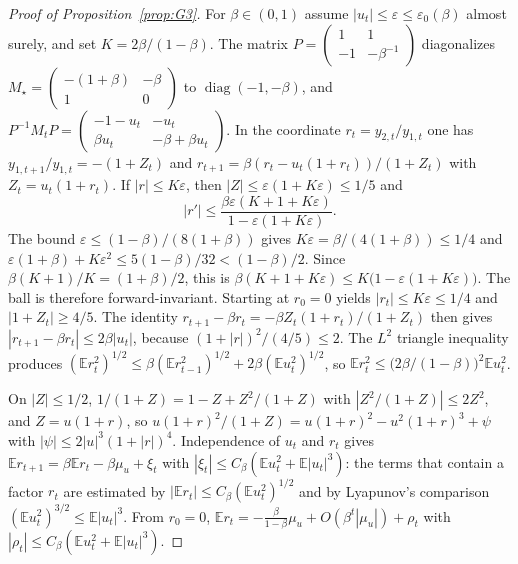 \documentclass[11pt]{article}
\theoremstyle{remark}
\newcommand{\E}{\mathbb{E}}
\begin{document}
\begin{proof}[Proof of Proposition~\ref{prop:G3}]
For $\beta\in(0,1)$ assume $|u_t|\le\varepsilon\le\varepsilon_0(\beta)$ almost surely, and set $K=2\beta/(1-\beta)$. The matrix $P=\begin{pmatrix}1&1\\-1&-\beta^{-1}\end{pmatrix}$ diagonalizes $M_\star=\begin{pmatrix}-(1+\beta)&-\beta\\1&0\end{pmatrix}$ to $\operatorname{diag}(-1,-\beta)$, and $P^{-1}M_tP=\begin{pmatrix}-1-u_t&-u_t\\\beta u_t&-\beta+\beta u_t\end{pmatrix}$. In the coordinate $r_t=y_{2,t}/y_{1,t}$ one has $y_{1,t+1}/y_{1,t}=-(1+Z_t)$ and $r_{t+1}=\beta(r_t-u_t(1+r_t))/(1+Z_t)$ with $Z_t=u_t(1+r_t)$. If $|r|\le K\varepsilon$, then $|Z|\le\varepsilon(1+K\varepsilon)\le1/5$ and
\[
|r'|\le\frac{\beta\varepsilon(K+1+K\varepsilon)}{1-\varepsilon(1+K\varepsilon)}.
\]
The bound $\varepsilon\le(1-\beta)/(8(1+\beta))$ gives $K\varepsilon=\beta/(4(1+\beta))\le1/4$ and $\varepsilon(1+\beta)+K\varepsilon^2\le5(1-\beta)/32<(1-\beta)/2$. Since $\beta(K+1)/K=(1+\beta)/2$, this is $\beta(K+1+K\varepsilon)\le K\big(1-\varepsilon(1+K\varepsilon)\big)$. The ball is therefore forward-invariant. Starting at $r_0=0$ yields $|r_t|\le K\varepsilon\le1/4$ and $|1+Z_t|\ge4/5$. The identity $r_{t+1}-\beta r_t=-\beta Z_t(1+r_t)/(1+Z_t)$ then gives $|r_{t+1}-\beta r_t|\le2\beta|u_t|$, because $(1+|r|)^2/(4/5)\le2$. The $L^2$ triangle inequality produces $(\E r_t^2)^{1/2}\le\beta(\E r_{t-1}^2)^{1/2}+2\beta(\E u_t^2)^{1/2}$, so $\E r_t^2\le\big(2\beta/(1-\beta)\big)^2\E u_t^2$.

On $|Z|\le1/2$, $1/(1+Z)=1-Z+Z^2/(1+Z)$ with $|Z^2/(1+Z)|\le2Z^2$, and $Z=u(1+r)$, so $u(1+r)^2/(1+Z)=u(1+r)^2-u^2(1+r)^3+\psi$ with $|\psi|\le2|u|^3(1+|r|)^4$. Independence of $u_t$ and $r_t$ gives $\E r_{t+1}=\beta\E r_t-\beta\mu_u+\xi_t$ with $|\xi_t|\le C_\beta(\E u_t^2+\E|u_t|^3)$: the terms that contain a factor $r_t$ are estimated by $|\E r_t|\le C_\beta(\E u_t^2)^{1/2}$ and by Lyapunov's comparison $(\E u_t^2)^{3/2}\le\E|u_t|^3$. From $r_0=0$, $\E r_t=-\frac{\beta}{1-\beta}\mu_u+O(\beta^t|\mu_u|)+\rho_t$ with $|\rho_t|\le C_\beta(\E u_t^2+\E|u_t|^3)$.


\end{proof}
\end{document}
